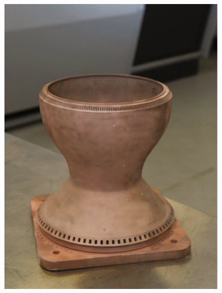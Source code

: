\begin{figure}
{        \includegraphics[scale=0.24]{Images/nozzlerocket.png}
    }
    \\
    \qquad
    \subfloat[\label{fig:skul}]{
}
\end{figure}

